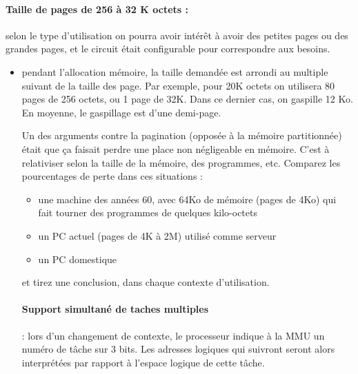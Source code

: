 \begin{multicols}{2}
\paragraph{Taille de pages de 256 à 32 K octets : } selon le type 
d'utilisation on pourra avoir intérêt à avoir des petites pages ou des
grandes pages, et le circuit était configurable pour correspondre aux besoins.
\begin{itemize}
\item pendant l'allocation mémoire, la taille demandée est arrondi au
  multiple suivant de la taille des page. Par exemple, pour 20K octets
  on utilisera 80 pages de 256 octets, ou 1 page de 32K. Dans ce
  dernier cas, on gaspille 12 Ko.  En moyenne, le gaspillage est d'une
  demi-page.
\begin{exercice}  Un des arguments contre la pagination (opposée à la mémoire partitionnée)
était que ça faisait perdre une place non négligeable en
mémoire. C'est à relativiser selon la taille de la mémoire, des programmes, etc. Comparez les pourcentages de perte dans
ces situations :
\begin{itemize}
\item une machine des années 60, avec 64Ko de mémoire (pages de 4Ko)
  qui fait tourner des programmes de quelques kilo-octets
\item un PC actuel (pages de 4K à 2M) utilisé comme serveur
\item un PC domestique
\end{itemize}
et tirez une conclusion, dans chaque contexte d'utilisation.
\end{exercice}


\paragraph{Support simultané de taches multiples} : lors d'un
changement de contexte, le processeur indique à la MMU un numéro de
tâche sur 3 bits. Les adresses logiques qui suivront seront alors interprétées par 
rapport à l'espace logique de cette tâche.



\end{itemize}
\end{multicols}
